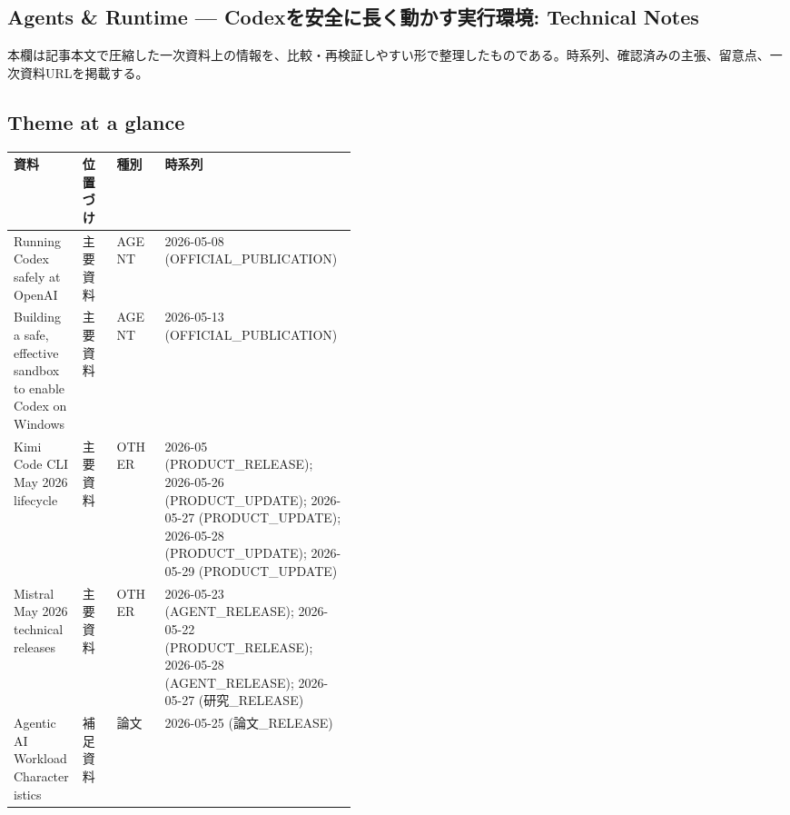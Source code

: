 \subsection*{Agents \& Runtime — Codexを安全に長く動かす実行環境: Technical Notes}
本欄は記事本文で圧縮した一次資料上の情報を、比較・再検証しやすい形で整理したものである。時系列、確認済みの主張、留意点、一次資料URLを掲載する。
\medskip
\subsection*{Theme at a glance}
\begin{center}
\footnotesize
\begin{tabularx}{\linewidth}{@{}p{0.20\linewidth}p{0.10\linewidth}p{0.14\linewidth}X@{}}
\toprule
資料 & 位置づけ & 種別 & 時系列 \\
\midrule
Running Codex safely at OpenAI & 主要資料 & AGENT & 2026-05-08 (OFFICIAL\_PUBLICATION) \\
Building a safe, effective sandbox to enable Codex on Windows & 主要資料 & AGENT & 2026-05-13 (OFFICIAL\_PUBLICATION) \\
Kimi Code CLI May 2026 lifecycle & 主要資料 & OTHER & 2026-05 (PRODUCT\_RELEASE); 2026-05-26 (PRODUCT\_UPDATE); 2026-05-27 (PRODUCT\_UPDATE); 2026-05-28 (PRODUCT\_UPDATE); 2026-05-29 (PRODUCT\_UPDATE) \\
Mistral May 2026 technical releases & 主要資料 & OTHER & 2026-05-23 (AGENT\_RELEASE); 2026-05-22 (PRODUCT\_RELEASE); 2026-05-28 (AGENT\_RELEASE); 2026-05-27 (研究\_RELEASE) \\
Agentic AI Workload Characteristics & 補足資料 & 論文 & 2026-05-25 (論文\_RELEASE) \\
\bottomrule
\end{tabularx}
\end{center}
\normalsize

